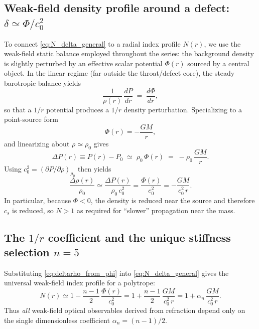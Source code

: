 \documentclass[11pt]{article}
\begin{document}
\subsection{Weak-field density profile around a defect: \texorpdfstring{$\delta\simeq \Phi/c_0^2$}{delta approx Phi/c\_0\string^2}}

To connect \eqref{eq:N_delta_general} to a radial index profile $N(r)$, we use the weak-field static balance employed throughout the series: the background density is slightly perturbed by an effective scalar potential $\Phi(r)$ sourced by a central object. In the linear regime (far outside the throat/defect core), the steady barotropic balance yields
\begin{equation}
\frac{1}{\rho(r)}\,\frac{dP}{dr} \;=\; \frac{d\Phi}{dr},
\label{eq:hydrostatic_balance}
\end{equation}
so that a $1/r$ potential produces a $1/r$ density perturbation. Specializing to a point-source form
\begin{equation}
\Phi(r) = -\frac{GM}{r},
\label{eq:Phi_point}
\end{equation}
and linearizing about $\rho\simeq\rho_0$ gives
\begin{equation}
\Delta P(r) \equiv P(r)-P_0
\;\simeq\;
\rho_0\,\Phi(r)
\;=\;
-\rho_0\,\frac{GM}{r}.
\label{eq:deltaP_from_phi}
\end{equation}
Using $c_0^2=(\partial P/\partial\rho)_{\rho_0}$ then yields
\begin{equation}
\frac{\Delta\rho(r)}{\rho_0}
\simeq
\frac{\Delta P(r)}{\rho_0\,c_0^2}
=
\frac{\Phi(r)}{c_0^2}
=
-\frac{GM}{c_0^2\,r}.
\label{eq:deltarho_from_phi}
\end{equation}
In particular, because $\Phi<0$, the density is reduced near the source and therefore $c_s$ is reduced, so $N>1$ as required for ``slower'' propagation near the mass. 

\subsection{The \texorpdfstring{$1/r$}{1/r} coefficient and the unique stiffness selection \texorpdfstring{$n=5$}{n=5}}

Substituting \eqref{eq:deltarho_from_phi} into \eqref{eq:N_delta_general} gives the universal weak-field index profile for a polytrope:
\begin{equation}
N(r)
\simeq
1-\frac{n-1}{2}\,\frac{\Phi(r)}{c_0^2}
=
1+\frac{n-1}{2}\,\frac{GM}{c_0^2\,r}
=
1+\alpha_n\,\frac{GM}{c_0^2\,r}.
\label{eq:N_r_general_n}
\end{equation}
Thus \emph{all} weak-field optical observables derived from refraction depend only on the single dimensionless coefficient $\alpha_n=(n-1)/2$. 
\end{document}
